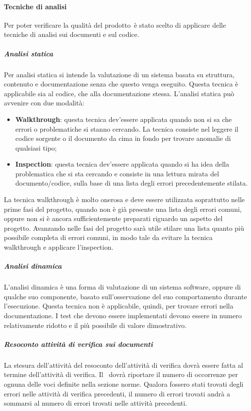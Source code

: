 \documentclass[../NormeProgetto.tex]{subfiles}
\begin{document}
	\paragraph{Tecniche di analisi}
	Per poter verificare la qualità del prodotto\g\ è stato scelto di applicare delle tecniche di analisi sui documenti e sul codice. 
		\subparagraph{Analisi statica} Per analisi statica si intende la valutazione di un sistema basata su struttura, contenuto e documentazione senza che questo venga eseguito. Questa tecnica è applicabile sia al codice, che alla documentazione stessa. L'analisi statica può avvenire con due modalità:
		\begin{itemize}
			\item \textbf{Walkthrough}: questa tecnica dev'essere applicata quando non si sa che errori o problematiche si stanno cercando. La tecnica consiste nel leggere il codice sorgente o il documento da cima in fondo per trovare anomalie  di qualsiasi tipo;
			\item \textbf{Inspection}: questa tecnica dev'essere applicata quando si ha idea della problematica che si sta cercando e consiste in una lettura mirata del documento/codice, sulla base di una lista degli errori precedentemente stilata.
		\end{itemize}
		La tecnica walkthrough è molto onerosa e deve essere utilizzata soprattutto nelle prime fasi del progetto, quando non è già presente una lista degli errori comuni, oppure non si è ancora sufficientemente preparati riguardo un aspetto del progetto. Avanzando nelle fasi del progetto sarà utile stilare una lista quanto più possibile completa di errori comuni, in modo tale da evitare la tecnica walkthrough e applicare l'inspection.
		
		\subparagraph{Analisi dinamica}
		L’analisi dinamica è una forma di valutazione di un sistema software\g, oppure di qualche suo componente, basato sull'osservazione del suo comportamento durante l'esecuzione. Questa tecnica non è applicabile, quindi, per trovare errori nella documentazione. I test che devono essere implementati devono essere in numero relativamente ridotto e il più possibile di valore dimostrativo.
		
		\subparagraph{Resoconto attività di verifica sui documenti}	
		La stesura dell'attività del resoconto dell'attività di verifica dovrà essere fatta al termine dell'attività di verifica. Il \verificatore\ dovrà riportare il numero di occorrenze per ognuna delle voci definite nella sezione norme. Qualora fossero stati trovati degli errori nelle attività di verifica precedenti, il numero di errori trovati andrà a sommarsi al numero di errori trovati nelle attività precedenti.
		
\end{document}
